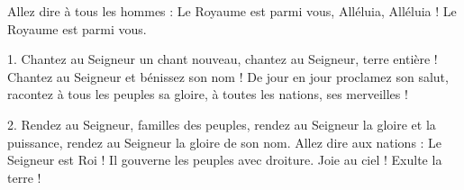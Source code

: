 Allez dire à tous les hommes :
Le Royaume est parmi vous, Alléluia, Alléluia !
Le Royaume est parmi vous.

1. Chantez au Seigneur un chant nouveau,
chantez au Seigneur, terre entière !
Chantez au Seigneur et bénissez son nom !
De jour en jour proclamez son salut,
racontez à tous les peuples sa gloire,
à toutes les nations, ses merveilles !

2.
Rendez au Seigneur, familles des peuples,
rendez au Seigneur la gloire et la puissance,
rendez au Seigneur la gloire de son nom.
Allez dire aux nations : \og Le Seigneur est Roi !\fg{}
Il gouverne les peuples avec droiture.
Joie au ciel ! Exulte la terre !

